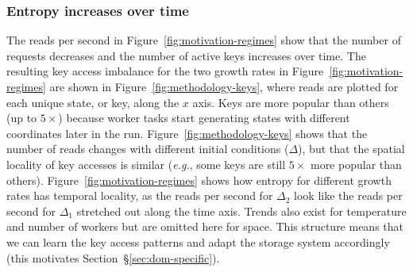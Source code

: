 \subsubsection*{Entropy increases over time} The reads per second in
Figure~\ref{fig:motivation-regimes} show that the number of requests decreases
and the number of active keys increases over time. The resulting key access
imbalance for the two growth rates in Figure~\ref{fig:motivation-regimes} are
shown in Figure~\ref{fig:methodology-keys}, where reads are plotted for each
unique state, or key, along the \(x\) axis. Keys are more popular than others
(up to \(5\times\)) because worker tasks start generating states with different
coordinates later in the run.  Figure~\ref{fig:methodology-keys} shows that the
number of reads changes with different initial conditions (\(\Delta\)), but
that the spatial locality of key accesses is similar ({\it e.g.}, some keys are
still \(5\times\) more popular than others).
Figure~\ref{fig:motivation-regimes} shows how entropy for different growth
rates has temporal locality, as the reads per second for \(\Delta_2\) look like
the reads per second for \(\Delta_1\) stretched out along the time axis.
Trends also exist for temperature and number of workers but are omitted here
for space. This structure means that we can learn the key access patterns and
adapt the storage system accordingly (this motivates
Section~\S\ref{sec:dom-specific}).
